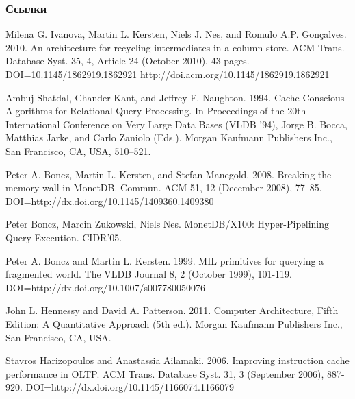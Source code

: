 \documentclass{beamer}
\begin{document}
\begin{frame}[allowframebreaks]
\frametitle{Ссылки}
\footnotesize{
\begin{thebibliography}{99}

 Milena G. Ivanova, Martin L. Kersten, Niels J. Nes, and Romulo A.P. Gonçalves. 2010. An architecture for recycling intermediates in a column-store. ACM Trans. Database Syst. 35, 4, Article 24 (October 2010), 43 pages. DOI=10.1145/1862919.1862921 http://doi.acm.org/10.1145/1862919.1862921 

 Ambuj Shatdal, Chander Kant, and Jeffrey F. Naughton. 1994. Cache Conscious Algorithms for Relational Query Processing. In Proceedings of the 20th International Conference on Very Large Data Bases (VLDB '94), Jorge B. Bocca, Matthias Jarke, and Carlo Zaniolo (Eds.). Morgan Kaufmann Publishers Inc., San Francisco, CA, USA, 510--521. 

 Peter A. Boncz, Martin L. Kersten, and Stefan Manegold. 2008. Breaking the memory wall in MonetDB. Commun. ACM 51, 12 (December 2008), 77--85. DOI=http://dx.doi.org/10.1145/1409360.1409380 

 Peter Boncz, Marcin Zukowski, Niels Nes. MonetDB/X100: Hyper-Pipelining Query Execution. CIDR'05.

 Peter A. Boncz and Martin L. Kersten. 1999. MIL primitives for querying a fragmented world. The VLDB Journal 8, 2 (October 1999), 101-119. DOI=http://dx.doi.org/10.1007/s007780050076 

  John L. Hennessy and David A. Patterson. 2011. Computer Architecture, Fifth Edition: A Quantitative Approach (5th ed.). Morgan Kaufmann Publishers Inc., San Francisco, CA, USA. 

 Stavros Harizopoulos and Anastassia Ailamaki. 2006. Improving instruction cache performance in OLTP. ACM Trans. Database Syst. 31, 3 (September 2006), 887-920. DOI=http://dx.doi.org/10.1145/1166074.1166079 



\end{thebibliography}}
\end{frame}
\end{document}
